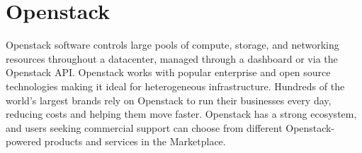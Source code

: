 
\section{Openstack}
Openstack software controls large pools of compute, storage, and networking resources throughout a datacenter, managed through a dashboard or via the Openstack API. Openstack works with popular enterprise and open source technologies making it ideal for heterogeneous infrastructure.
Hundreds of the world’s largest brands rely on Openstack to run their businesses every day, reducing costs and helping them move faster. Openstack has a strong ecosystem, and users seeking commercial support can choose from different Openstack-powered products and services in the Marketplace. \cite{Openstack}

